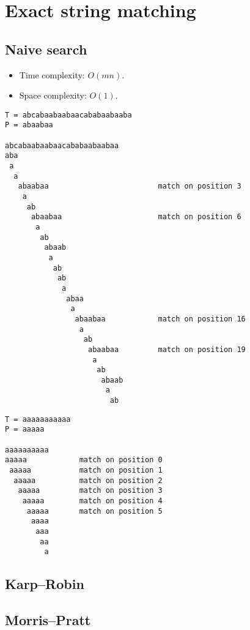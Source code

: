 \chapter{Exact string matching}

\section{Naive search}
\begin{itemize}
\item Time complexity: $O(mn)$.
\item Space complexity: $O(1)$.
\end{itemize}

\begin{verbatim}
T = abcabaabaabaacababaabaaba
P = abaabaa

abcabaabaabaacababaabaabaa
aba
 a
  a
   abaabaa                         match on position 3
    a
     ab
      abaabaa                      match on position 6
       a
        ab
         abaab
          a
           ab
            ab
             a
              abaa
               a
                abaabaa            match on position 16
                 a
                  ab
                   abaabaa         match on position 19
                    a
                     ab
                      abaab
                       a
                        ab
\end{verbatim}

\begin{verbatim}
T = aaaaaaaaaaa
P = aaaaa

aaaaaaaaaa
aaaaa            match on position 0
 aaaaa           match on position 1
  aaaaa          match on position 2
   aaaaa         match on position 3
    aaaaa        match on position 4
     aaaaa       match on position 5
      aaaa
       aaa
        aa
         a
\end{verbatim}


\section{Karp--Robin}

\section{Morris--Pratt}


